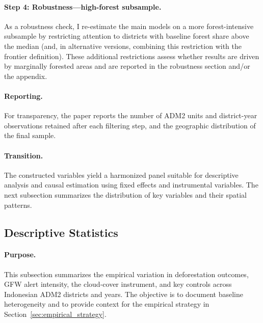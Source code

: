 \documentclass[hidelinks,12pt]{article}
\begin{document}
\paragraph{Step 4: Robustness—high-forest subsample.}
As a robustness check, I re-estimate the main models on a more forest-intensive subsample by restricting attention to districts with baseline forest share above the median (and, in alternative versions, combining this restriction with the frontier definition). These additional restrictions assess whether results are driven by marginally forested areas and are reported in the robustness section and/or the appendix.

\paragraph{Reporting.}
For transparency, the paper reports the number of ADM2 units and district-year observations retained after each filtering step, and the geographic distribution of the final sample.

\paragraph{Transition.}
The constructed variables yield a harmonized panel suitable for descriptive analysis and causal estimation using fixed effects and instrumental variables. The next subsection summarizes the distribution of key variables and their spatial patterns.


\subsection{Descriptive Statistics}




\paragraph{Purpose.}
This subsection summarizes the empirical variation in deforestation outcomes, GFW alert intensity, the cloud-cover instrument, and key controls across Indonesian ADM2 districts and years. The objective is to document baseline heterogeneity and to provide context for the empirical strategy in Section~\ref{sec:empirical_strategy}.
\end{document}
